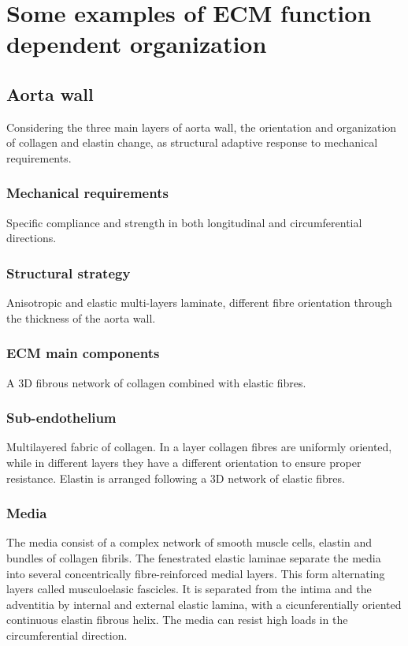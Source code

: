 \section{Some examples of ECM function dependent organization}

	\subsection{Aorta wall}
	Considering the three main layers of aorta wall, the orientation and organization of collagen and elastin change, as structural adaptive response to mechanical requirements.

		\subsubsection{Mechanical requirements}
		Specific compliance and strength in both longitudinal and circumferential directions.

		\subsubsection{Structural strategy}
		Anisotropic and elastic multi-layers laminate, different fibre orientation through the thickness of the aorta wall.

		\subsubsection{ECM main components}
		A 3D fibrous network of collagen combined with elastic fibres.

		\subsubsection{Sub-endothelium}
		Multilayered fabric of collagen.
		In a layer collagen fibres are uniformly oriented, while in different layers they have a different orientation to ensure proper resistance.
		Elastin is arranged following a 3D network of elastic fibres.

		\subsubsection{Media}
		The media consist of a complex network of smooth muscle cells, elastin and bundles of collagen fibrils.
		The fenestrated elastic laminae separate the media into several concentrically fibre-reinforced medial layers.
		This form alternating layers called musculoelasic fascicles.
		It is separated from the intima and the adventitia by internal and external elastic lamina, with a cicunferentially oriented continuous elastin fibrous helix.
		The media can resist high loads in the circumferential direction.

